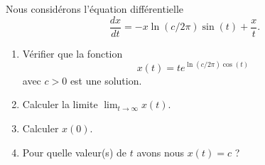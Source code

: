
\begin{exercice}\label{exoSVT-0003}

    Nous considérons l'équation différentielle
    \begin{equation}
        \frac{ dx }{ dt }=-x\ln(c/2\pi)\sin(t)+\frac{ x }{ t }.
    \end{equation}

    \begin{enumerate}
        \item
            
            Vérifier que la fonction
            \begin{equation}
                x(t)=t  e^{ \ln(c/2\pi)\cos(t)}
            \end{equation}
            avec \( c>0\) est une solution.

    \item
        Calculer la limite \( \lim_{t\to \infty} x(t)\).
    \item
        Calculer \( x(0)\).
    \item
        Pour quelle valeur(s) de \( t\) avons nous \( x(t)=c\) ?

    \end{enumerate}
    
\end{exercice}
